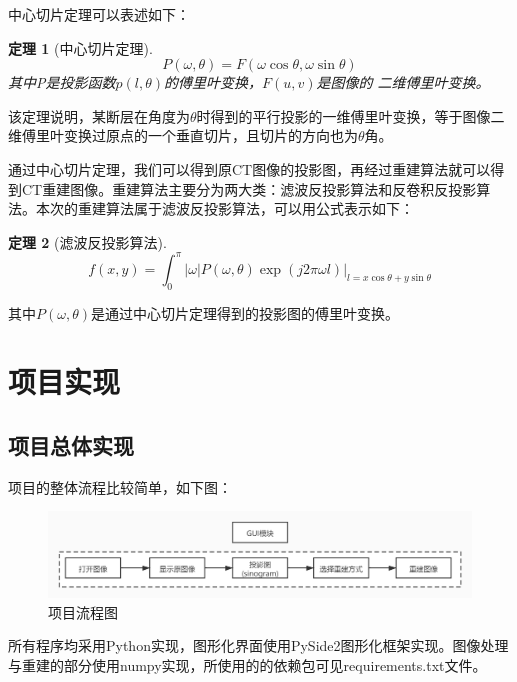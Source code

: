 \documentclass[UTF8]{ctexart}
\newtheorem{theorem}{定理}
\begin{document}
中心切片定理可以表述如下：
\begin{theorem}[中心切片定理]
    $$P(\omega,\theta)=F(\omega\cos\theta,\omega\sin\theta)$$
    其中P是投影函数$p(l,\theta)$的傅里叶变换，$F(u,v)$是图像的
    二维傅里叶变换。
\end{theorem}
该定理说明，某断层在角度为$\theta$时得到的平行投影的一维傅里叶变换，等于图像二维傅里叶变换过原点的一个垂直切片，且切片的方向也为$\theta$角。\cite{ramesh1989algorithm}

通过中心切片定理，我们可以得到原CT图像的投影图，再经过重建算法就可以得到CT重建图像。重建算法主要分为两大类：滤波反投影算法和反卷积反投影算法。本次的重建算法属于滤波反投影算法，可以用公式表示如下：\cite{kak2002principles}

\begin{theorem}[滤波反投影算法]
    $$f(x,y)=\int_0^{\pi}|\omega|P(\omega,\theta)\exp(j2\pi\omega l)\lvert_{l=x\cos\theta+y\sin\theta}$$
\end{theorem}
其中$P(\omega,\theta)$是通过中心切片定理得到的投影图的傅里叶变换。
\newpage
\section{项目实现}
\subsection{项目总体实现}
项目的整体流程比较简单，如下图：

\begin{figure}[H]
    \centering
    \includegraphics[width=\textwidth]{../image/workflow.jpg}
    \caption{项目流程图}
    \label{fig workflow}
\end{figure}
所有程序均采用Python实现，图形化界面使用PySide2图形化框架实现。图像处理与重建的部分使用numpy实现，所使用的的依赖包可见requirements.txt文件。
\end{document}
